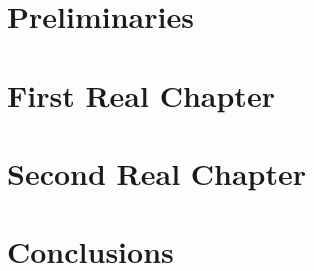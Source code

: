 \documentclass[a4paper,10pt,twoside]{report}
\begin{document}
\clearemptydoublepage

\chapter{Preliminaries}\label{chapter:preliminaries}


\clearemptydoublepage

\chapter{First Real Chapter}\label{chapter:first_real_chapter}


\clearemptydoublepage

\chapter{Second Real Chapter}\label{chapter:second_real_chapter}


\clearemptydoublepage

\chapter{Conclusions}\label{chapter:conclusions}


\clearemptydoublepage

%



\clearemptydoublepage

\appendix
{}


\end{document}
